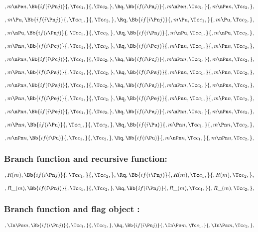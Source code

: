\[,m \nPe n, \Bb{if(i \Pn j)}{,\Tc c_1,}{,\Tc c_2,}, \Rq , \Bb{if(i \Pn j)}{,m \nPe n,\Tc c_1,}{,m \nPe n,\Tc c_2,},\]
\bigskip
\bigskip

\[,m \Pu, \Bb{if(i \Pn j)}{,\Tc c_1,}{,\Tc c_2,}, \Rq , \Bb{if(i \Pn j)}{,m \Pu,\Tc c_1,}{,m \Pu,\Tc c_2,},\]
\bigskip
\bigskip

\[,m \nPu, \Bb{if(i \Pn j)}{,\Tc c_1,}{,\Tc c_2,}, \Rq , \Bb{if(i \Pn j)}{,m \nPu,\Tc c_1,}{,m \nPu,\Tc c_2,},\]
\bigskip
\bigskip


\[,m \Pn n, \Bb{if(i \Pc j)}{,\Tc c_1,}{,\Tc c_2,}, \Rq , \Bb{if(i \Pc j)}{,m \Pn n,\Tc c_1,}{,m \Pn n,\Tc c_2,},\]
\bigskip
\bigskip

\[,m \nPn n, \Bb{if(i \Pc j)}{,\Tc c_1,}{,\Tc c_2,}, \Rq , \Bb{if(i \Pc j)}{,m \nPn n,\Tc c_1,}{,m \nPn n,\Tc c_2,},\]
\bigskip
\bigskip

\[,m \Pn n, \Bb{if(i \Ps j)}{,\Tc c_1,}{,\Tc c_2,}, \Rq , \Bb{if(i \Ps j)}{,m \Pn n,\Tc c_1,}{,m \Pn n,\Tc c_2,},\]
\bigskip
\bigskip

\[,m \nPn n, \Bb{if(i \Ps j)}{,\Tc c_1,}{,\Tc c_2,}, \Rq , \Bb{if(i \Ps j)}{,m \nPn n,\Tc c_1,}{,m \nPn n,\Tc c_2,},\]
\bigskip
\bigskip

\[,m \Pn n, \Bb{if(i \Pe j)}{,\Tc c_1,}{,\Tc c_2,}, \Rq , \Bb{if(i \Pe j)}{,m \Pn n,\Tc c_1,}{,m \Pn n,\Tc c_2,},\]
\bigskip
\bigskip

\[,m \nPn n, \Bb{if(i \Pe j)}{,\Tc c_1,}{,\Tc c_2,}, \Rq , \Bb{if(i \Pe j)}{,m \nPn n,\Tc c_1,}{,m \nPn n,\Tc c_2,},\]
\bigskip
\bigskip

\[,m \Pn n, \Bb{if(i \Pu)}{,\Tc c_1,}{,\Tc c_2,}, \Rq , \Bb{if(i \Pu)}{,m \Pn n,\Tc c_1,}{,m \Pn n,\Tc c_2,},\]
\bigskip
\bigskip

\[,m \nPn n, \Bb{if(i \Pu)}{,\Tc c_1,}{,\Tc c_2,}, \Rq , \Bb{if(i \Pu)}{,m \nPn n,\Tc c_1,}{,m \nPn n,\Tc c_2,},\]
\bigskip
\bigskip



\bigskip
\bigskip
\bigskip
\bigskip
\subsubsection{Branch function and recursive function:}
\[,R(m), \Bb{if(i \Pn j)}{,\Tc c_1,}{,\Tc c_2,}, \Rq , \Bb{if(i \Pn j)}{,R(m),\Tc c_1,}{,R(m),\Tc c_2,},\]
\bigskip
\bigskip

\[,R\_(m), \Bb{if(i \Pn j)}{,\Tc c_1,}{,\Tc c_2,}, \Rq , \Bb{if(i \Pn j)}{,R\_(m),\Tc c_1,}{,R\_(m),\Tc c_2,},\]
\bigskip
\bigskip


\bigskip
\bigskip
\bigskip
\bigskip
\subsubsection{Branch function and flag object :}
\[,\In \Ps m, \Bb{if(i \Pn j)}{,\Tc c_1,}{,\Tc c_2,}, \Rq , \Bb{if(i \Pn j)}{,\In \Ps m,\Tc c_1,}{,\In \Ps m,\Tc c_2,},\]
\bigskip
\bigskip

